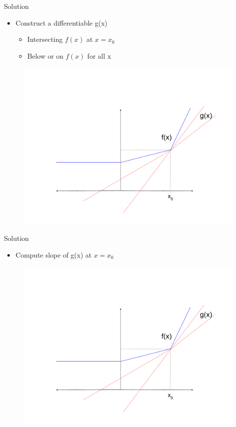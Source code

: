 \documentclass{beamer}
\begin{document}
\begin{frame}{Solution}

\begin{itemize}
\item Construct a differentiable g(x) 
\begin{itemize}
    \item Intersecting $f(x)$ at $x = x_0$
    \item Below or on $f(x)$ for all x
\end{itemize}
\end{itemize}
\begin{figure}
    \centering
    \includegraphics[scale = 0.25]{subgradient_2.pdf}
    \label{fig:my_label}
\end{figure}
\end{frame}

\begin{frame}{Solution}

\begin{itemize}
\item Compute slope of g(x) at $x = x_0$
\end{itemize}
\begin{figure}
    \centering
    \includegraphics[scale = 0.25]{subgradient_2.pdf}
    
    \label{fig:my_label}
\end{figure}
\end{frame}
\end{document}
